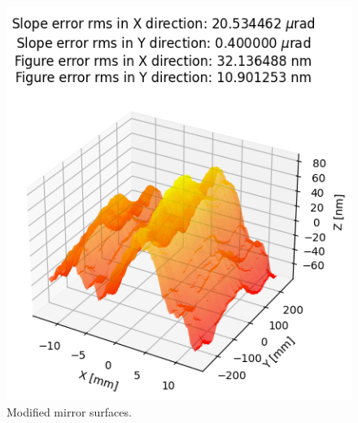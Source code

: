 \begin{figure}[!htb]
\endminipage\hfill
{}%
  \includegraphics[width=\linewidth]{./../figures/slope_error/surface_error_profile_500x25_04x20urad.png}
\endminipage
\caption{\label{fig:fractals} Modified mirror surfaces. }
\end{figure}
